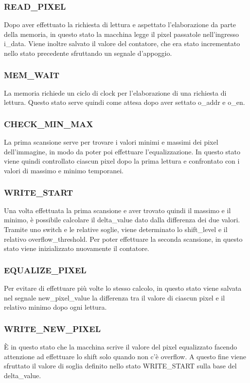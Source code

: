 \documentclass{article}
\begin{document}
\subsubsection{READ\_PIXEL}
Dopo aver effettuato la richiesta di lettura e aspettato l'elaborazione da parte della memoria, in questo stato la macchina legge il pixel passatole nell'ingresso i\_data. Viene inoltre salvato il valore del contatore, che era stato incrementato nello stato precedente sfruttando un segnale d'appoggio.

\subsubsection{MEM\_WAIT}
La memoria richiede un ciclo di clock per l'elaborazione di una richiesta di lettura. Questo stato serve quindi come attesa dopo aver settato o\_addr e o\_en.

\subsubsection{CHECK\_MIN\_MAX}
La prima scansione serve per trovare i valori minimi e massimi dei pixel dell'immagine, in modo da poter poi effettuare l'equalizzazione. In questo stato viene quindi controllato ciascun pixel dopo la prima lettura e confrontato con i valori di massimo e minimo temporanei.

\subsubsection{WRITE\_START}
Una volta effettuata la prima scansione e aver trovato quindi il massimo e il minimo, è possibile calcolare il delta\_value dato dalla differenza dei due valori. Tramite uno switch e le relative soglie, viene determinato lo shift\_level e il relativo overflow\_threshold. Per poter effettuare la seconda scansione, in questo stato viene inizializzato nuovamente il contatore.

\subsubsection{EQUALIZE\_PIXEL}
Per evitare di effettuare più volte lo stesso calcolo, in questo stato viene salvata nel segnale new\_pixel\_value la differenza tra il valore di ciascun pixel e il relativo minimo dopo ogni lettura.

\subsubsection{WRITE\_NEW\_PIXEL}
È in questo stato che la macchina scrive il valore del pixel equalizzato facendo attenzione ad effettuare lo shift solo quando non c'è overflow. A questo fine viene sfruttato il valore di soglia definito nello stato WRITE\_START sulla base del delta\_value.
\end{document}
